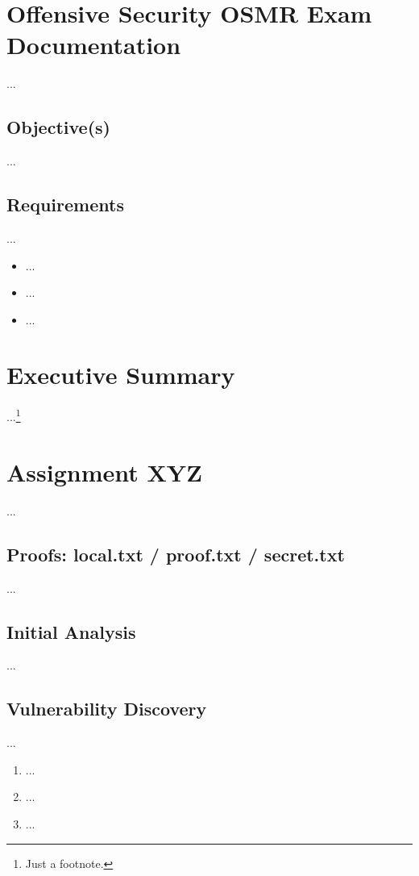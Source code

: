 %
%
%
\section{Offensive Security OSMR Exam Documentation}\label{osmr-sec:sec1}
%
...
%
%
%
\subsection{Objective(s)}\label{osmr-sec:sec1-obj}
%
...~\cite{MitreAttack}
%
%
%
\subsection{Requirements}\label{osmr-sec:sec1-req}
%
...

\begin{itemize}
    \item ...
    \item ...
    \item ...
\end{itemize}
%
%
%
\section{Executive Summary}\label{osmr-sec:sec2}
%
...\footnote{Just a footnote.}
%
%
%
\section{Assignment XYZ}\label{osmr-sec:sec3}
%
...
%
%
%
\subsection{Proofs: local.txt / proof.txt / secret.txt}\label{osmr-sec:sec3-proofs}
%
...
%
%
%
\subsection{Initial Analysis}\label{osmr-sec:sec3-init}
%
...
%
%
%
\subsection{Vulnerability Discovery}\label{osmr-sec:sec3-vuln}
%
...

\begin{enumerate}
    \item ...
    \item ...
    \item ...
\end{enumerate}
%
%
%
